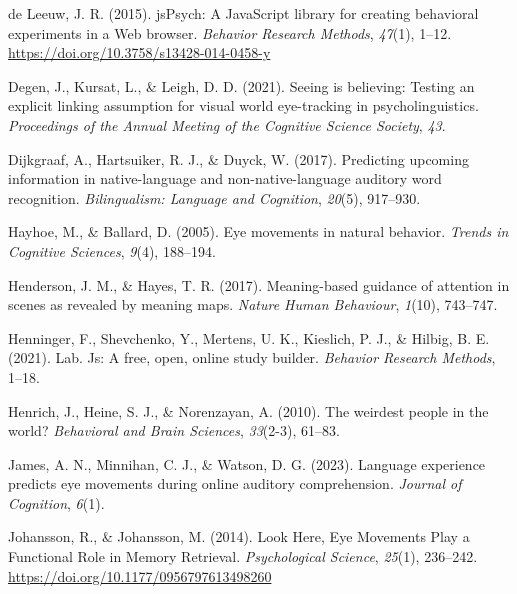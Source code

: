 \documentclass[
  man,floatsintext]{apa6}
\newlength{\cslhangindent}
\newlength{\cslentryspacingunit} %
\newenvironment{CSLReferences}[2] %
 {%
  \setlength{\parindent}{0pt}
  \ifodd #1
  \let\oldpar\par
  \def\par{\hangindent=\cslhangindent\oldpar}
  \fi
  \setlength{\parskip}{#2\cslentryspacingunit}
 }%
 {}
\begin{document}
\begin{CSLReferences}{1}{0}
\leavevmode{}%
de Leeuw, J. R. (2015). {jsPsych}: {A JavaScript} library for creating behavioral experiments in a {Web} browser. \emph{Behavior Research Methods}, \emph{47}(1), 1--12. \url{https://doi.org/10.3758/s13428-014-0458-y}

\leavevmode{}%
Degen, J., Kursat, L., \& Leigh, D. D. (2021). Seeing is believing: Testing an explicit linking assumption for visual world eye-tracking in psycholinguistics. \emph{Proceedings of the Annual Meeting of the Cognitive Science Society}, \emph{43}.

\leavevmode{}%
Dijkgraaf, A., Hartsuiker, R. J., \& Duyck, W. (2017). Predicting upcoming information in native-language and non-native-language auditory word recognition. \emph{Bilingualism: Language and Cognition}, \emph{20}(5), 917--930.

\leavevmode{}%
Hayhoe, M., \& Ballard, D. (2005). Eye movements in natural behavior. \emph{Trends in Cognitive Sciences}, \emph{9}(4), 188--194.

\leavevmode{}%
Henderson, J. M., \& Hayes, T. R. (2017). Meaning-based guidance of attention in scenes as revealed by meaning maps. \emph{Nature Human Behaviour}, \emph{1}(10), 743--747.

\leavevmode{}%
Henninger, F., Shevchenko, Y., Mertens, U. K., Kieslich, P. J., \& Hilbig, B. E. (2021). Lab. Js: A free, open, online study builder. \emph{Behavior Research Methods}, 1--18.

\leavevmode{}%
Henrich, J., Heine, S. J., \& Norenzayan, A. (2010). The weirdest people in the world? \emph{Behavioral and Brain Sciences}, \emph{33}(2-3), 61--83.

\leavevmode{}%
James, A. N., Minnihan, C. J., \& Watson, D. G. (2023). Language experience predicts eye movements during online auditory comprehension. \emph{Journal of Cognition}, \emph{6}(1).

\leavevmode{}%
Johansson, R., \& Johansson, M. (2014). Look {Here}, {Eye Movements Play} a {Functional Role} in {Memory Retrieval}. \emph{Psychological Science}, \emph{25}(1), 236--242. \url{https://doi.org/10.1177/0956797613498260}


\end{CSLReferences}
\end{document}
